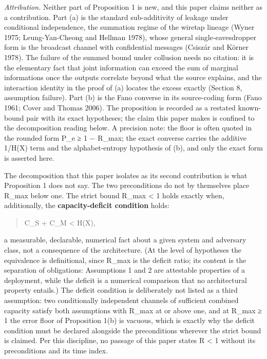 \documentclass[
]{llncs}
\begin{document}
\emph{Attribution.} Neither part of Proposition 1 is new, and this paper
claims neither as a contribution. Part (a) is the standard
sub-additivity of leakage under conditional independence, the summation
regime of the wiretap lineage (Wyner 1975; Leung-Yan-Cheong and Hellman
1978), whose general single-eavesdropper form is the broadcast channel
with confidential messages (Csiszár and Körner 1978). The failure of the
summed bound under collusion needs no citation: it is the elementary
fact that joint information can exceed the sum of marginal informations
once the outputs correlate beyond what the source explains, and the
interaction identity in the proof of (a) locates the excess exactly
(Section 8, assumption failure). Part (b) is the Fano converse in its
source-coding form (Fano 1961; Cover and Thomas 2006). The proposition
is recorded as a restated known-bound pair with its exact hypotheses;
the claim this paper makes is confined to the decomposition reading
below. A precision note: the floor is often quoted in the rounded form
P\_e ≥ 1 − R\_max; the exact converse carries the additive 1/H(X) term
and the alphabet-entropy hypothesis of (b), and only the exact form is
asserted here.

The decomposition that this paper isolates as its second contribution is
what Proposition 1 does not say. The two preconditions do not by
themselves place R\_max below one. The strict bound R\_max \textless{} 1
holds exactly when, additionally, the \textbf{capacity-deficit
condition} holds:

\begin{quote}
C\_S + C\_M \textless{} H(X),
\end{quote}

a measurable, declarable, numerical fact about a given system and
adversary class, not a consequence of the architecture. (At the level of
hypotheses the equivalence is definitional, since R\_max is the deficit
ratio; its content is the separation of obligations: Assumptions 1 and 2
are attestable properties of a deployment, while the deficit is a
numerical comparison that no architectural property entails.) The
deficit condition is deliberately not listed as a third assumption: two
conditionally independent channels of sufficient combined capacity
satisfy both assumptions with R\_max at or above one, and at R\_max ≥ 1
the error floor of Proposition 1(b) is vacuous, which is exactly why the
deficit condition must be declared alongside the preconditions wherever
the strict bound is claimed. Per this discipline, no passage of this
paper states R \textless{} 1 without its preconditions and its time
index.
\end{document}
